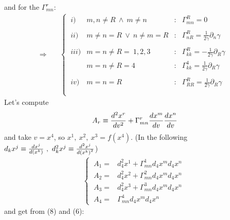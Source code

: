 and for the $\Gamma^r_{mn}$:\\
\begin{align}
\Rightarrow \quad & \left \{ \begin{array}{llll}
\ i)& m,n \neq R \ \wedge \ m \neq n &:& \Gamma^R_{mn}=0\\\\
\ ii)& m \neq n = R \ \vee \  n \neq m = R &:& \Gamma^R_{nR}=\frac{1}{2 \gamma} \partial_n \gamma \\\\
\ iii)& m =n \neq R = \ 1,2,3 &:& \Gamma^R_{kk}=-\frac{1}{2 \gamma}  \partial_R \gamma\\
\ & m =n \neq R =4 &:& \Gamma^4_{kk}=\frac{1}{2 \gamma}  \partial_R \gamma\\\\
\ iv)& m =n= R &:& \Gamma^R_{RR}=\frac{1}{2 \gamma}  \partial_R \gamma\\\\
\end{array}\right.
\end{align}
Let's compute 
\begin{align}
\ A_r \equiv \dv[2]{x^r}{v} + \Gamma^r_{mn}\dv{x^m}{v}\dv{x^n}{v}
\end{align}
and take $v = x^4$, so $x^1, \  x^2,  \ x^3 = f(x^4)$. (In the following $d_kx^j \equiv \dv{x^j}{{(x^{k})}}\ , \ d^2_kx^j \equiv \dv[2]{x^j}{{(x^{k})}}$)
\begin{align}
\left \{ \begin{array}{ll}
\ A_1 = &  d^2_4x^1+ \Gamma^1_{mn}d_4x^md_4x^n\\
\ A_2 = &  d^2_4x^2+ \Gamma^2_{mn}d_4x^md_4x^n\\
\ A_3 = &  d^2_4x^3+ \Gamma^3_{mn}d_4x^md_4x^n\\
\ A_4 = &   \Gamma^4_{mn}d_4x^md_4x^n
\end{array} \right.
\end{align}
and get from (8) and (6):
